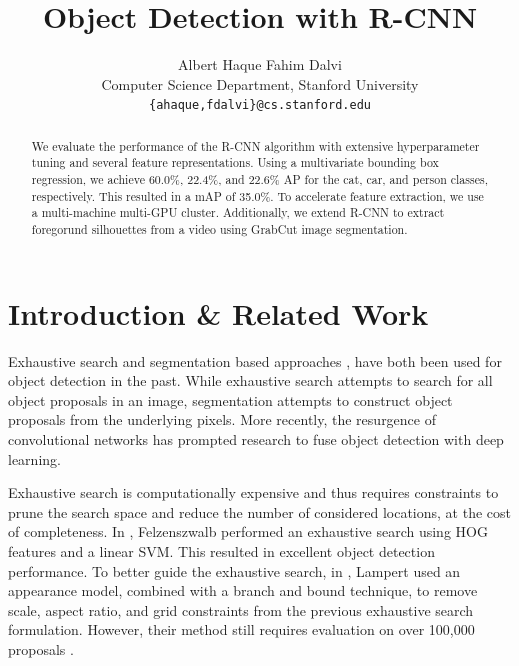 \documentclass[10pt,twocolumn,letterpaper]{article}
\begin{document}
\title{Object Detection with R-CNN}

\author{Albert Haque \qquad Fahim Dalvi\\
Computer Science Department, Stanford University \\
{\tt\small \{ahaque,fdalvi\}@cs.stanford.edu}
}

\maketitle

\begin{abstract}
\vspace{-2mm}
We evaluate the performance of the R-CNN algorithm with extensive hyperparameter tuning and several feature representations. Using a multivariate bounding box regression, we achieve 60.0\%, 22.4\%, and 22.6\% AP for the cat, car, and person classes, respectively. This resulted in a mAP of 35.0\%. To accelerate feature extraction, we use a multi-machine multi-GPU cluster. Additionally, we extend R-CNN to extract foregorund silhouettes from a video using GrabCut image segmentation.
   \vspace{-2mm}
\end{abstract}


\section{Introduction \& Related Work}
Exhaustive search \cite{dalal2005histograms, harzallah2009combining, viola2004robust} and segmentation based approaches \cite{carreira2010constrained, endres2010category}, have both been used for object detection in the past. While exhaustive search attempts to search for all object proposals in an image, segmentation attempts to construct object proposals from the underlying pixels. More recently, the resurgence of convolutional networks has prompted research to fuse object detection with deep learning.

Exhaustive search is computationally expensive and thus requires constraints to prune the search space and reduce the number of considered locations, at the cost of completeness. In \cite{felzenszwalb2010object}, Felzenszwalb \etal performed an exhaustive search using HOG features and a linear SVM. This resulted in excellent object detection performance. To better guide the exhaustive search, in \cite{lampert2009efficient}, Lampert \etal used an appearance model, combined with a branch and bound technique, to remove scale, aspect ratio, and grid constraints from the previous exhaustive search formulation. However, their method still requires evaluation on over 100,000 proposals \cite{alexe2010object}.
\end{document}
